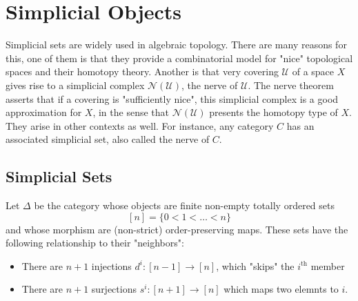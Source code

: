 \section{Simplicial Objects}


Simplicial sets are widely used in algebraic topology. There are many reasons for this, one of them is that they provide a combinatorial model for "nice" topological spaces and their homotopy theory. Another is that very covering $\mathcal{U}$ of a space $X$ gives rise to a simplicial complex $\mathcal{N(U)}$, the nerve of $\mathcal{U}$. The nerve theorem asserts that if a covering is "sufficiently nice", this simplicial complex is a good approximation for $X$, in the sense that $\mathcal{N(U)}$ presents the homotopy type of $X$.\\

They arise in other contexts as well. For instance, any category $C$ has an associated simplicial set, also called the nerve of $C$.

\subsection{Simplicial Sets}
Let $\Delta$ be the category whose objects are finite non-empty totally ordered sets 
\[ [n] = \{0<1<\dots<n\}\]
and whose morphism are (non-strict) order-preserving maps. These sets have the following relationship to their "neighbors":
\begin{itemize}
  \item There are $n+1$ injections $d^i: [n-1] \to [n]$, which "skips" the $i^{\text{th}}$ member
  \item There are $n+1$ surjections $s^i: [n+1] \to [n]$ which maps two elemnts to $i$.
\end{itemize}

